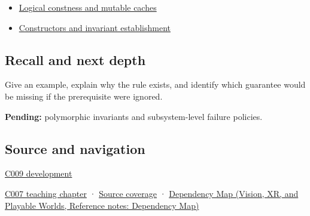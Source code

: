 \hypertarget{appendix-8e5214819615-used-by}{}

\begin{itemize}
\tightlist
\item
  \hyperref[appendix-f5593256bcaf]{Logical constness and mutable caches}
\item
  \hyperref[appendix-7f8ec83d0886]{Constructors and invariant establishment}
\end{itemize}

\subsection{Recall and next depth}\label{appendix-8e5214819615-recall-and-next-depth}

\hypertarget{appendix-8e5214819615-recall-and-next-depth}{}

Give an example, explain why the rule exists, and identify which guarantee would be missing if the prerequisite were ignored.

\textbf{Pending:} polymorphic invariants and subsystem-level failure policies.

\subsection{Source and navigation}\label{appendix-8e5214819615-source-and-navigation}

\hypertarget{appendix-8e5214819615-source-and-navigation}{}

\hyperref[appendix-fd090d982a15-m009---parts-127-147]{C009 development}

\hyperref[01-foundations-i-ch003-public-records-and-protected-invariants]{C007 teaching chapter} · \hyperref[appendix-fd090d982a15-m007---parts-101-112]{Source coverage} · \href{../07-Vision-XR-and-Playable-Worlds/main.pdf\#nameddest=appendix-4ad47bdd269a}{Dependency Map (Vision, XR, and Playable Worlds, Reference notes: Dependency Map)}
